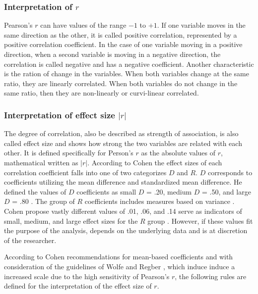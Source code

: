 \documentclass[a4paper,headsepline,footsepline,fontsize=11pt,BCOR=12mm,DIV=12]{report}
\begin{document}
\subsubsection{Interpretation of $r$}
Pearson's $r$ can have values of the range $-1$ to $+1$. If one variable moves in the same direction as the other, it is called positive correlation, represented by a positive correlation coefficient. In the case of one variable moving in a positive direction, when a second variable is moving in a negative direction, the correlation is called negative and has a negative coefficient. Another characteristic is the ration of change in the variables. When both variables change at the same ratio, they are linearly correlated. When both variables do not change in the same ratio, then they are non-linearly or curvi-linear correlated. 

\subsubsection{Interpretation of effect size $|r|$}
The degree of correlation, also be described as strength of association, is also called effect size and shows how strong the two variables are related with each other. It is defined specifically for Person's $r$ as the absolute values of $r$, mathematical written as $|r|$. According to Cohen \cite{Cohen1988} the effect sizes of each correlation coefficient falls into one of two categorizes $D$ and $R$. $D$ corresponds to coefficients utilizing the mean difference and standardized mean difference. He defined the values of $D$ coefficients as small $D$ = .20, medium $D$ = .50, and large $D$ = .80 \cite{Piegorsch2002}. The group of $R$ coefficients includes measures based on variance \cite{Walker2005}. Cohen propose vastly different values of .01, .06, and .14 serve as indicators of small, medium, and large effect sizes for the $R$ group \cite{Cohen1988}. However, if these values fit the purpose of the analysis, depends on the underlying data and is at discretion of the researcher.


According to Cohen recommendations for mean-based coefficients \cite{Cohen1988,Piegorsch2002,Walker2005} and with consideration of the guidelines of Wolfe \cite{Wolfe2017} and Regber \cite{Regber2016}, which induce induce a increased scale due to the high sensitivity of Pearson's $r$, the following rules are defined for the interpretation of the effect size of $r$.
\end{document}
